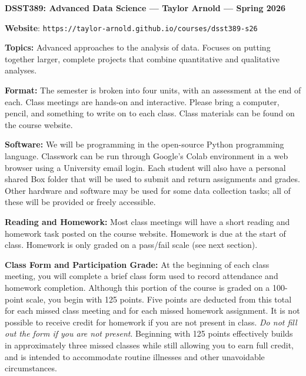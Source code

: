 \documentclass[11pt, a4paper]{article}
\begin{document}
\begin{center}
\textbf{DSST389: Advanced Data Science --- Taylor Arnold --- Spring 2026}
\end{center}

\vspace{0.5cm}

\textbf{Website}: \texttt{https://taylor-arnold.github.io/courses/dsst389-s26}

\bigskip

\textbf{Topics:}
Advanced approaches to the analysis of data. Focuses on putting together larger, complete projects that combine quantitative and qualitative analyses. 

\bigskip

\textbf{Format:}
The semester is broken into four units, with an assessment at the end of each.
Class meetings are hands-on and interactive. Please bring a computer, pencil,
and something to write on to each class. Class materials can be found on the
course website.

\bigskip

\textbf{Software:}
We will be programming in the open-source Python programming language. 
Classwork can be run through Google's Colab environment in a web browser using
a University email login. Each student will also have a personal shared Box folder
that will be used to submit and return assignments and grades. Other hardware
and software may be used for some data collection tasks; all of these will
be provided or freely accessible. 

\bigskip

\textbf{Reading and Homework:}
Most class meetings will have a short reading and homework task posted on the course website. Homework is due at the start of class. Homework is only graded on a pass/fail scale (see next section).

\bigskip

\textbf{Class Form and Participation Grade:}
At the beginning of each class meeting, you will complete a brief class form used to record attendance and homework completion. Although this portion of the course is graded on a 100-point scale, you begin with 125 points. Five points are deducted from this total for each missed class meeting and for each missed homework assignment. It is not possible to receive credit for homework if you are not present in class. \textit{Do not fill out the form if you are not present}. Beginning with 125 points effectively builds in approximately three missed classes while still allowing you to earn full credit, and is intended to accommodate routine illnesses and other unavoidable circumstances.
\end{document}
